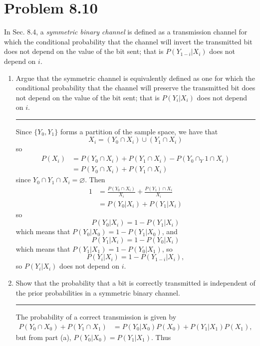 \documentclass{article}
\newcommand{\horline}
           {\begin{center}
              \noindent\rule{8cm}{0.4pt}
            \end{center}}
\begin{document}
\section*{Problem 8.10}
In Sec. 8.4, a \textit{symmetric binary channel} is defined as a 
transmission channel for which the conditional probability that the channel
will invert the transmitted bit does not depend on the value of the bit
sent; that is $P(Y_{1-i} | X_i)$ does not depend on $i$.
\begin{enumerate}[label=(\alph*)]
  \item{Argue that the symmetric channel is equivalently defined as one for
        which the conditional probability that the channel will preserve
        the transmitted bit does not depend on the value of the bit sent;
        that is $P(Y_i | X_i)$ does not depend on $i$.
        \horline
        Since $\{Y_0, Y_1\}$ forms a partition of the sample space, we have
        that 
        $$
        X_i = (Y_0 \cap X_i) \cup (Y_1 \cap X_i)
        $$
        so
        \begin{align*}
        P(X_i) & = P(Y_0 \cap X_i) + P(Y_1 \cap X_i) - P(Y_0 \cap _Y1 \cap X_i)\\
               & = P(Y_0 \cap X_i) + P(Y_1 \cap X_i)
        \end{align*}
        since $Y_0 \cap Y_1 \cap X_i = \varnothing$. Then
        \begin{align*}
        1 & = \frac{P(Y_0 \cap X_i)}{X_i} + \frac{P(Y_1) \cap X_i}{X_i}\\
          & = P(Y_0 | X_i) + P(Y_1 | X_i)
        \end{align*}
        so
        $$
        P(Y_0 | X_i) = 1 - P(Y_1 | X_i)
        $$
        which means that $P(Y_0 | X_0) = 1 - P(Y_1 | X_0)$, and
        $$
        P(Y_1 | X_i) = 1 - P(Y_0 | X_i)
        $$
        which means that $P(Y_1 | X_1) = 1 - P(Y_0 | X_1)$, so
        $$
        P(Y_i | X_i) = 1 - P(Y_{1-i} | X_i),
        $$
        so $P(Y_i | X_i)$ does not depend on $i$.
       }
  \item{Show that the probability that a bit is correctly transmitted is
        independent of the prior probabilities in a symmetric binary 
        channel.
        \horline
        The probability of a correct transmission is given by 
        \begin{align*}
        P(Y_0 \cap X_0) + P(Y_1 \cap X_1) 
          & = P(Y_0 | X_0) P(X_0) + P(Y_1 | X_1) P(X_1),
        \end{align*}
        but from part (a), $P(Y_0 | X_0) = P(Y_1 | X_1)$. Thus
}
\end{enumerate}
\end{document}
